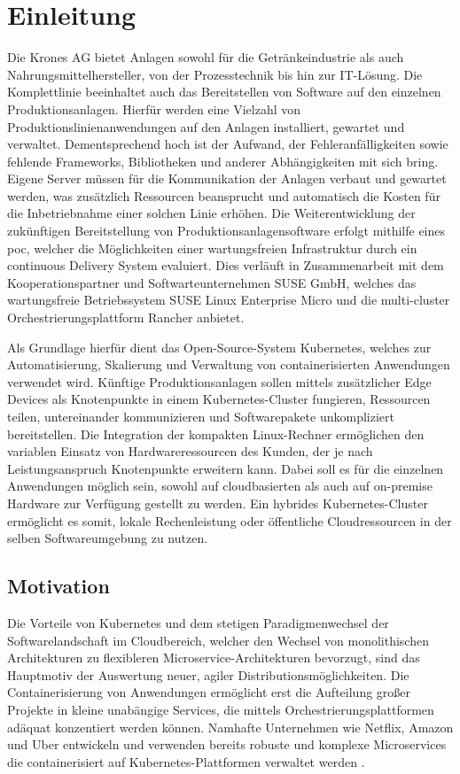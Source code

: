 \chapter{Einleitung}
Die Krones AG bietet Anlagen sowohl für die Getränkeindustrie als auch 
Nahrungsmittelhersteller, von der Prozesstechnik bis hin zur IT-Lösung. 
Die Komplettlinie beeinhaltet auch das Bereitstellen von Software auf den einzelnen Produktionsanlagen. 
Hierfür werden eine Vielzahl von Produktionslinienanwendungen auf den Anlagen installiert, gewartet
und verwaltet. Dementsprechend hoch ist der Aufwand, der Fehleranfälligkeiten sowie fehlende Frameworks, Bibliotheken
und anderer Abhängigkeiten mit sich bring.
Eigene Server müssen für die Kommunikation der Anlagen verbaut und gewartet werden,
was zusätzlich Ressourcen beansprucht und automatisch die Kosten für die Inbetriebnahme einer solchen
Linie erhöhen. Die Weiterentwicklung der zukünftigen Bereitstellung von Produktionsanlagensoftware
erfolgt mithilfe eines \ac*{poc}, welcher die Möglichkeiten einer wartungsfreien Infrastruktur
durch ein continuous Delivery System evaluiert. Dies verläuft in Zusammenarbeit mit dem
Kooperationspartner und Softwarteunternehmen SUSE GmbH, welches das wartungsfreie Betriebssystem
SUSE Linux Enterprise Micro und die multi-cluster Orchestrierungsplattform Rancher anbietet.

Als Grundlage hierfür dient das Open-Source-System Kubernetes, welches zur Automatisierung, Skalierung
und Verwaltung von containerisierten Anwendungen verwendet wird. Künftige Produktionsanlagen sollen mittels zusätzlicher Edge Devices
als Knotenpunkte in einem Kubernetes-Cluster fungieren, Ressourcen teilen, untereinander kommunizieren und Softwarepakete unkompliziert bereitstellen.
Die Integration der kompakten Linux-Rechner ermöglichen den variablen Einsatz von Hardwareressourcen des Kunden, der je nach Leistungsanspruch Knotenpunkte erweitern kann.
Dabei soll es für die einzelnen Anwendungen möglich sein, sowohl auf cloudbasierten als auch auf on-premise Hardware zur Verfügung gestellt zu werden.
Ein hybrides Kubernetes-Cluster ermöglicht es somit, lokale Rechenleistung oder öffentliche Cloudressourcen in der selben Softwareumgebung zu nutzen.
\section{Motivation}
Die Vorteile von Kubernetes und dem stetigen Paradigmenwechsel der Softwarelandschaft im Cloudbereich, welcher
den Wechsel von monolithischen Architekturen zu flexibleren Microservice-Architekturen
bevorzugt, sind das Hauptmotiv der Auswertung neuer, agiler Distributionsmöglichkeiten.
Die Containerisierung von Anwendungen ermöglicht erst die Aufteilung großer Projekte
in kleine unabängige Services, die mittels Orchestrierungsplattformen adäquat konzentiert werden können.
Namhafte Unternehmen wie Netflix, Amazon und Uber entwickeln und verwenden
bereits robuste und komplexe Microservices die containerisiert auf Kubernetes-Plattformen
verwaltet werden \cite{microservice}. 

